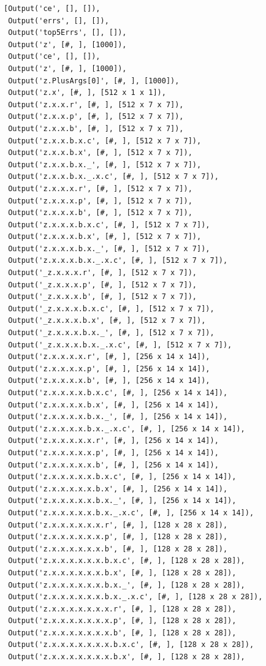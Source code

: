 \documentclass[]{book}
\theoremstyle{definition}
\theoremstyle{definition}
\theoremstyle{definition}
\theoremstyle{remark}
\begin{document}
\begin{verbatim}
[Output('ce', [], []),
 Output('errs', [], []),
 Output('top5Errs', [], []),
 Output('z', [#, ], [1000]),
 Output('ce', [], []),
 Output('z', [#, ], [1000]),
 Output('z.PlusArgs[0]', [#, ], [1000]),
 Output('z.x', [#, ], [512 x 1 x 1]),
 Output('z.x.x.r', [#, ], [512 x 7 x 7]),
 Output('z.x.x.p', [#, ], [512 x 7 x 7]),
 Output('z.x.x.b', [#, ], [512 x 7 x 7]),
 Output('z.x.x.b.x.c', [#, ], [512 x 7 x 7]),
 Output('z.x.x.b.x', [#, ], [512 x 7 x 7]),
 Output('z.x.x.b.x._', [#, ], [512 x 7 x 7]),
 Output('z.x.x.b.x._.x.c', [#, ], [512 x 7 x 7]),
 Output('z.x.x.x.r', [#, ], [512 x 7 x 7]),
 Output('z.x.x.x.p', [#, ], [512 x 7 x 7]),
 Output('z.x.x.x.b', [#, ], [512 x 7 x 7]),
 Output('z.x.x.x.b.x.c', [#, ], [512 x 7 x 7]),
 Output('z.x.x.x.b.x', [#, ], [512 x 7 x 7]),
 Output('z.x.x.x.b.x._', [#, ], [512 x 7 x 7]),
 Output('z.x.x.x.b.x._.x.c', [#, ], [512 x 7 x 7]),
 Output('_z.x.x.x.r', [#, ], [512 x 7 x 7]),
 Output('_z.x.x.x.p', [#, ], [512 x 7 x 7]),
 Output('_z.x.x.x.b', [#, ], [512 x 7 x 7]),
 Output('_z.x.x.x.b.x.c', [#, ], [512 x 7 x 7]),
 Output('_z.x.x.x.b.x', [#, ], [512 x 7 x 7]),
 Output('_z.x.x.x.b.x._', [#, ], [512 x 7 x 7]),
 Output('_z.x.x.x.b.x._.x.c', [#, ], [512 x 7 x 7]),
 Output('z.x.x.x.x.r', [#, ], [256 x 14 x 14]),
 Output('z.x.x.x.x.p', [#, ], [256 x 14 x 14]),
 Output('z.x.x.x.x.b', [#, ], [256 x 14 x 14]),
 Output('z.x.x.x.x.b.x.c', [#, ], [256 x 14 x 14]),
 Output('z.x.x.x.x.b.x', [#, ], [256 x 14 x 14]),
 Output('z.x.x.x.x.b.x._', [#, ], [256 x 14 x 14]),
 Output('z.x.x.x.x.b.x._.x.c', [#, ], [256 x 14 x 14]),
 Output('z.x.x.x.x.x.r', [#, ], [256 x 14 x 14]),
 Output('z.x.x.x.x.x.p', [#, ], [256 x 14 x 14]),
 Output('z.x.x.x.x.x.b', [#, ], [256 x 14 x 14]),
 Output('z.x.x.x.x.x.b.x.c', [#, ], [256 x 14 x 14]),
 Output('z.x.x.x.x.x.b.x', [#, ], [256 x 14 x 14]),
 Output('z.x.x.x.x.x.b.x._', [#, ], [256 x 14 x 14]),
 Output('z.x.x.x.x.x.b.x._.x.c', [#, ], [256 x 14 x 14]),
 Output('z.x.x.x.x.x.x.r', [#, ], [128 x 28 x 28]),
 Output('z.x.x.x.x.x.x.p', [#, ], [128 x 28 x 28]),
 Output('z.x.x.x.x.x.x.b', [#, ], [128 x 28 x 28]),
 Output('z.x.x.x.x.x.x.b.x.c', [#, ], [128 x 28 x 28]),
 Output('z.x.x.x.x.x.x.b.x', [#, ], [128 x 28 x 28]),
 Output('z.x.x.x.x.x.x.b.x._', [#, ], [128 x 28 x 28]),
 Output('z.x.x.x.x.x.x.b.x._.x.c', [#, ], [128 x 28 x 28]),
 Output('z.x.x.x.x.x.x.x.r', [#, ], [128 x 28 x 28]),
 Output('z.x.x.x.x.x.x.x.p', [#, ], [128 x 28 x 28]),
 Output('z.x.x.x.x.x.x.x.b', [#, ], [128 x 28 x 28]),
 Output('z.x.x.x.x.x.x.x.b.x.c', [#, ], [128 x 28 x 28]),
 Output('z.x.x.x.x.x.x.x.b.x', [#, ], [128 x 28 x 28]),

\end{verbatim}
\end{document}
